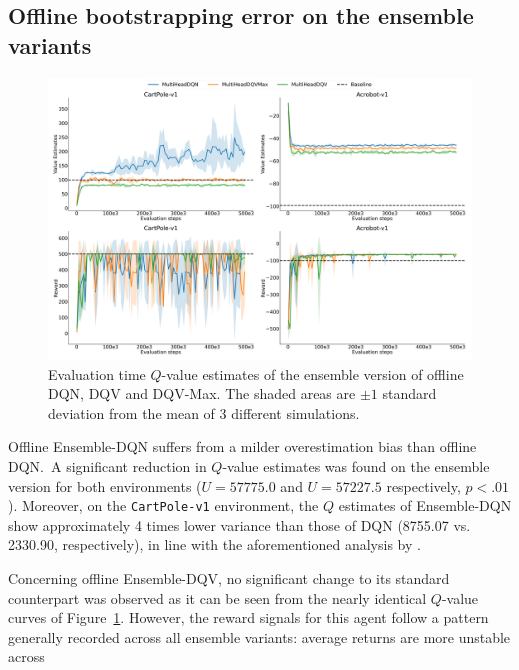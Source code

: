 \subsection{Offline bootstrapping error on the ensemble variants}
\begin{figure}[!tbp]
  \centering
  \includegraphics[width=.5\textwidth]{img/dshift_plots_ensembles.png}
  \caption{Evaluation time $Q$-value estimates of the ensemble version
    of offline DQN, DQV and DQV-Max. The shaded areas are $\pm 1$
    standard deviation from the mean of 3 different
    simulations.}\label{fig:dshift_offline_ensemble}
\end{figure}
Offline Ensemble-DQN suffers from a milder overestimation bias than
offline DQN.\ A significant reduction in $Q$-value estimates was
found on the ensemble version for both environments ($U=57775.0$ and
$U=57227.5$ respectively, $p<.01$). Moreover, on the
\texttt{CartPole-v1} environment, the $Q$ estimates of Ensemble-DQN
show approximately 4 times lower variance than those of DQN (8755.07
vs. 2330.90, respectively), in line with the aforementioned analysis
by \citet{anschel2017averaged}.



Concerning offline Ensemble-DQV, no significant change to its standard
counterpart was observed as it can be seen from the nearly identical
$Q$-value curves of Figure~\ref{fig:dshift_offline_ensemble}. However,
the reward signals for this agent follow a pattern generally recorded
across all ensemble variants: average returns are more unstable across


